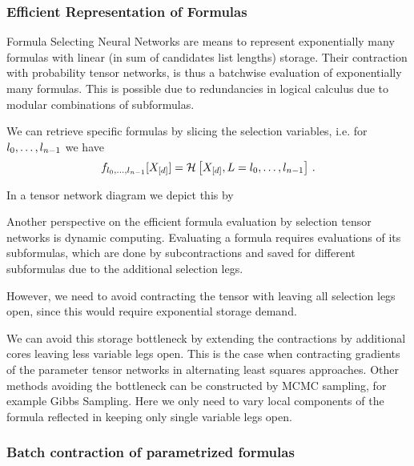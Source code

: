 \subsubsection{Efficient Representation of Formulas}


Formula Selecting Neural Networks are means to represent exponentially many formulas with linear (in sum of candidates list lengths) storage.
Their contraction with probability tensor networks, is thus a batchwise evaluation of exponentially many formulas.
This is possible due to redundancies in logical calculus due to modular combinations of subformulas.

We can retrieve specific formulas by slicing the selection variables, i.e. for $l_{0},\ldots,l_{n-1}$ we have
	\[ f_{l_{0},\ldots,l_{n-1}}[X_{[d]}] = \mathcal{H}\left[X_{[d]},L=l_{0},\ldots,l_{n-1}\right] \, .  \]

In a tensor network diagram we depict this by
\begin{center}
	
\end{center}

Another perspective on the efficient formula evaluation by selection tensor networks is dynamic computing.
Evaluating a formula requires evaluations of its subformulas, which are done by subcontractions and saved for different subformulas due to the additional selection legs.

However, we need to avoid contracting the tensor with leaving all selection legs open, since this would require exponential storage demand.

We can avoid this storage bottleneck by extending the contractions by additional cores leaving less variable legs open.
This is the case when contracting gradients of the parameter tensor networks in alternating least squares approaches.
Other methods avoiding the bottleneck can be constructed by MCMC sampling, for example Gibbs Sampling.
Here we only need to vary local components of the formula reflected in keeping only single variable legs open.



\subsubsection{Batch contraction of parametrized formulas}


